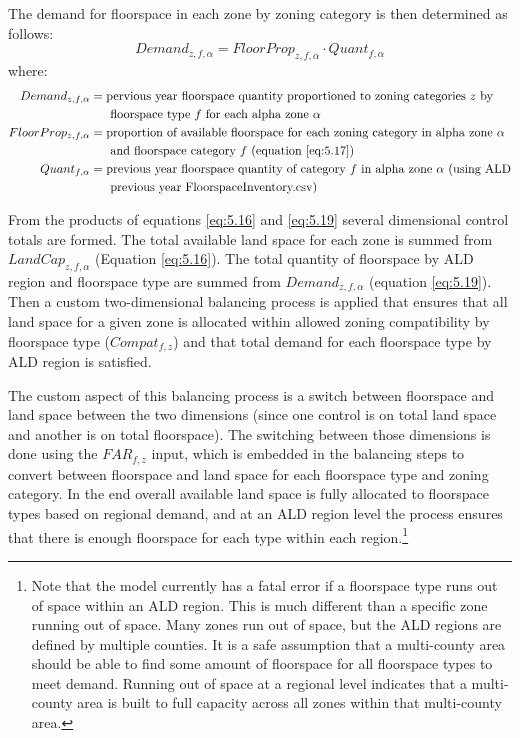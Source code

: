 \noindent The demand for floorspace in each zone by zoning category is then determined as follows:
\begin{equation}\label{eq:5.19}   %
Demand_{z,f,\alpha} = FloorProp_{z,f,\alpha} \cdot Quant_{f,\alpha}
\end{equation}
\noindent where:
\begin{align*}
Demand_{z,f,\alpha} &= \text{pervious year floorspace quantity proportioned to zoning categories $z$ by} \\
 &~~~~~\text{floorspace type $f$ for each alpha zone $\alpha$} \\
FloorProp_{z,f,\alpha} &= \text{proportion of available floorspace for each zoning category in alpha zone $\alpha$} \\
 &~~~~~\text{and floorspace category $f$ (equation \ref{eq:5.17})} \\
Quant_{f,\alpha} &= \text{previous year floorspace quantity of category $f$ in alpha zone $\alpha$ (using ALD} \\
 &~~~~~\text{previous year FloorspaceInventory.csv)}
\end{align*}

From the products of equations \ref{eq:5.16} and \ref{eq:5.19} several dimensional control totals are formed. The total available land space for each zone is summed from $LandCap_{z,f,\alpha}$ (Equation \ref{eq:5.16}). The total quantity of floorspace by ALD region and floorspace type are summed from $Demand_{z,f,\alpha}$ (equation \ref{eq:5.19}). Then a custom two-dimensional balancing process is applied that ensures that all land space for a given zone is allocated within allowed zoning compatibility by floorspace type ($Compat_{f,z}$) and that total demand for each floorspace type by ALD region is satisfied.

The custom aspect of this balancing process is a switch between floorspace and land space between the two dimensions (since one control is on total land space and another is on total floorspace). The switching between those dimensions is done using the $FAR_{f,z}$ input, which is embedded in the balancing steps to convert between floorspace and land space for each floorspace type and zoning category. In the end overall available land space is fully allocated to floorspace types based on regional demand, and at an ALD region level the process ensures that there is enough floorspace for each type within each region.\footnote{Note that the model currently has a fatal error if a floorspace type runs out of space within an ALD region. This is much different than a specific zone running out of space. Many zones run out of space, but the ALD regions are defined by multiple counties. It is a safe assumption that a multi-county area should be able to find some amount of floorspace for all floorspace types to meet demand. Running out of space at a regional level indicates that a multi-county area is built to full capacity across all zones within that multi-county area.}


